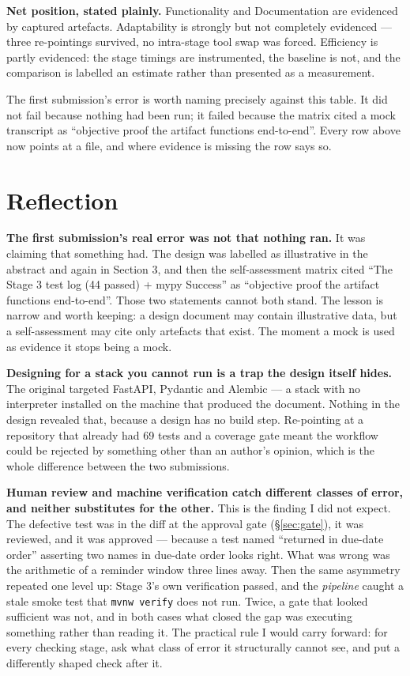 \documentclass[11pt,a4paper]{article}
\newcommand{\code}[1]{\texttt{\small #1}}
\begin{document}
\noindent\textbf{Net position, stated plainly.} Functionality and Documentation
are evidenced by captured artefacts. Adaptability is strongly but not
completely evidenced --- three re-pointings survived, no intra-stage tool swap
was forced. Efficiency is partly evidenced: the stage timings are instrumented,
the baseline is not, and the comparison is labelled an estimate rather than
presented as a measurement.

The first submission's error is worth naming precisely against this table. It
did not fail because nothing had been run; it failed because the matrix cited a
mock transcript as ``objective proof the artifact functions end-to-end''. Every
row above now points at a file, and where evidence is missing the row says so.

\section{Reflection}

\textbf{The first submission's real error was not that nothing ran.} It was
claiming that something had. The design was labelled as illustrative in the
abstract and again in Section 3, and then the self-assessment matrix cited
``The Stage 3 test log (44 passed) + mypy Success'' as ``objective proof the
artifact functions end-to-end''. Those two statements cannot both stand. The
lesson is narrow and worth keeping: a design document may contain illustrative
data, but a self-assessment may cite only artefacts that exist. The moment a
mock is used as evidence it stops being a mock.

\textbf{Designing for a stack you cannot run is a trap the design itself
hides.} The original targeted FastAPI, Pydantic and Alembic --- a stack with no
interpreter installed on the machine that produced the document. Nothing in the
design revealed that, because a design has no build step. Re-pointing at a
repository that already had 69 tests and a coverage gate meant the workflow
could be rejected by something other than an author's opinion, which is the
whole difference between the two submissions.

\textbf{Human review and machine verification catch different classes of
error, and neither substitutes for the other.} This is the finding I did not
expect. The defective test was in the diff at the approval gate
(\S\ref{sec:gate}), it was reviewed, and it was approved --- because a test
named ``returned in due-date order'' asserting two names in due-date order
looks right. What was wrong was the arithmetic of a reminder window three lines
away. Then the same asymmetry repeated one level up: Stage 3's own
verification passed, and the \emph{pipeline} caught a stale smoke test that
\code{mvnw verify} does not run. Twice, a gate that looked sufficient was not,
and in both cases what closed the gap was executing something rather than
reading it. The practical rule I would carry forward: for every checking stage,
ask what class of error it structurally cannot see, and put a differently
shaped check after it.
\end{document}
